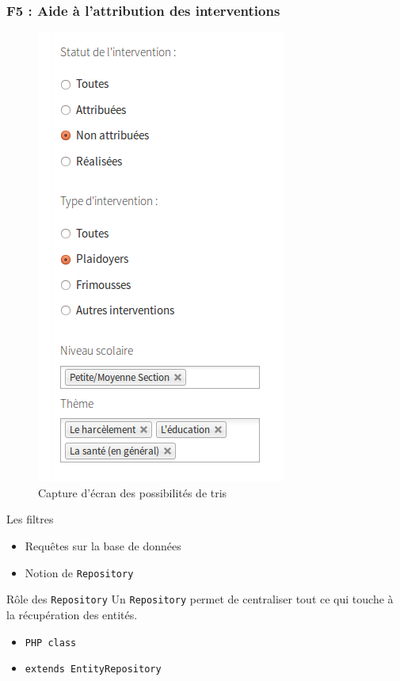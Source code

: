 \speaker{\Julie}

\begin{frame}
\frametitle{F5 : Aide à l'attribution des interventions}
	\begin{minipage}[c]{.40\linewidth}
      \begin{figure}[r]
		\includegraphics[scale=0.3]{images/filtreListeIntervention.png}
		\caption{Capture d'écran des possibilités de tris}
	  \end{figure}
   \end{minipage} \hfill
   \begin{minipage}[c]{.52\linewidth}
      \begin{block}{Les filtres}
		\begin{itemize}
			\item Requêtes sur la base de données
			\item Notion de \texttt{Repository}
		\end{itemize}
	  \end{block}
	  \begin{block}{Rôle des \texttt{Repository}}
		Un \texttt{Repository} permet de centraliser tout ce qui touche à la récupération des entités.
		\begin{itemize}
		\item \texttt{PHP class} 
		\item \texttt{extends EntityRepository}
		\end{itemize}
	  \end{block}
   \end{minipage} \hfill
\end{frame}

